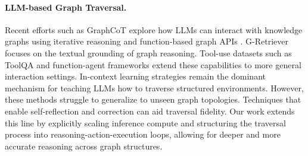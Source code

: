 \paragraph{LLM-based Graph Traversal.}
Recent efforts such as GraphCoT \citep{jin2024graph} explore how LLMs can interact with knowledge graphs using iterative reasoning and function-based graph APIs \citep{jin2024largelanguagemodelsgraphs}. G-Retriever \citep{he2024gretrieverretrievalaugmentedgenerationtextual} focuses on the textual grounding of graph reasoning. Tool-use datasets such as ToolQA \citep{zhuang2023toolqa} and function-agent frameworks \citep{xi2023risepotentiallargelanguage} extend these capabilities to more general interaction settings. In-context learning strategies \citep{dong2024surveyincontextlearning} remain the dominant mechanism for teaching LLMs how to traverse structured environments. However, these methods struggle to generalize to unseen graph topologies. Techniques that enable self-reflection and correction \citep{uesato2022solvingmathwordproblems, 10.5555/3600270.3602070} can aid traversal fidelity. Our work extends this line by explicitly scaling inference compute and structuring the traversal process into reasoning-action-execution loops, allowing for deeper and more accurate reasoning across graph structures.
